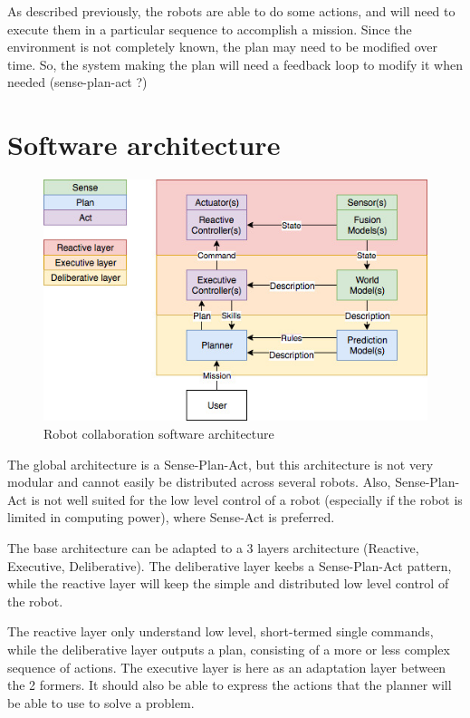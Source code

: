 \documentclass[conference]{IEEEtran}
\begin{document}
As described previously, the robots are able to do some actions, and will need to execute them in a particular sequence to accomplish a mission.
Since the environment is not completely known, the plan may need to be modified over time.
So, the system making the plan will need a feedback loop to modify it when needed (sense-plan-act ?)

\section{Software architecture}

\begin{figure}
  \centering
  \caption{\label{3layers}Robot collaboration software architecture}
  \includegraphics[scale=0.40]{img/3layers}
\end{figure}

The global architecture is a Sense-Plan-Act, but this architecture is not very modular and cannot easily be distributed across several robots.
Also, Sense-Plan-Act is not well suited for the low level control of a robot (especially if the robot is limited in computing power), where Sense-Act is preferred.

The base architecture can be adapted to a 3 layers architecture (Reactive, Executive, Deliberative).
The deliberative layer keebs a Sense-Plan-Act pattern, while the reactive layer will keep the simple and distributed low level control of the robot.

The reactive layer only understand low level, short-termed single commands, while the deliberative layer outputs a plan, consisting of a more or less complex sequence of actions.
The executive layer is here as an adaptation layer between the 2 formers.
It should also be able to express the actions that the planner will be able to use to solve a problem.
\end{document}
